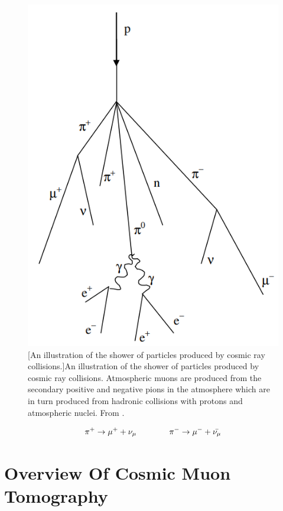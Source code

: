\begin{figure}[!h]
 \centering
 \includegraphics[width=0.3333\linewidth]{Chapter5/Figs/Raster/muonShower.png}
 [An illustration of the shower of particles produced by cosmic ray collisions.]{An illustration of the shower of particles produced by cosmic ray collisions. Atmospheric muons are produced from the secondary positive and negative pions in the atmosphere which are in turn produced from hadronic collisions with protons and atmospheric nuclei. From \cite{MuonPhysics}.}
 \label{fig:muonShower}
\end{figure}

\begin{equation}
  \pi^+ \rightarrow \mu^+ + \nu_\mu  \qquad \qquad \pi^- \rightarrow \mu^- + \Bar{\nu_\mu} 
  \label{equ:pi+-atmos}
\end{equation}

\section{Overview Of Cosmic Muon Tomography}\label{sec:cosMuOverview}


